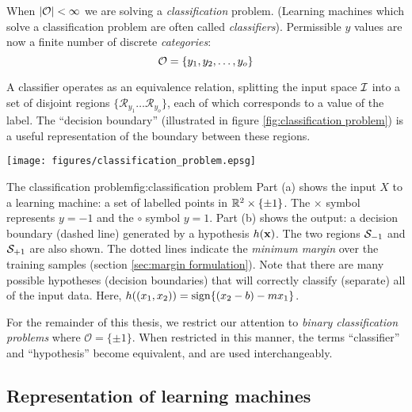 When $|\mathcal{O}| < \infty$ we are solving a \emph{classification}
problem.  (Learning machines which solve a classification problem are
often called \emph{classifiers}).  Permissible $y$ values are now
a finite number of discrete \emph{categories}:
%
\begin{equation}
\mathcal{O} = \{y_1, y_2, \ldots, y_o\}
\end{equation}

A classifier operates as an equivalence relation, splitting the input
space $\mathcal{I}$ into a set of disjoint regions $\{ \mathcal{R}_{y_1}
\ldots \mathcal{R}_{y_o} \}$, each of which corresponds to a value of
the label.  The ``decision boundary'' (illustrated in figure
\ref{fig:classification problem}) is a useful representation of the
boundary between these regions.

\begin{linefigure}
\begin{center}
\texttt{[image: figures/classification\_problem.epsg]}
\end{center}
\begin{capt}{The classification problem}{fig:classification problem}
Part (a) shows the input $X$ to a learning machine: a set of
labelled points in $\mathbb{R}^2 \times \{ \pm 1 \}$.  The $\times$ symbol
represents $y=-1$ and the $\circ$ symbol $y=1$.  Part (b) shows the
output: a decision boundary (dashed line) generated by a hypothesis
$h(\mathbf{x})$.  The two regions $\mathcal{S}_{-1}$ and $\mathcal{S}_{+1}$ are also
shown.  The dotted lines indicate the \emph{minimum margin} over the
training samples (section \ref{sec:margin formulation}).  Note that
there are many possible hypotheses (decision boundaries) that will
correctly classify (separate) all of the input data.  Here, $h((x_1,
x_2)) = \mathrm{sign}\{ (x_2 - b) - m x_1 \}$.
\end{capt}
\end{linefigure}

For the remainder of this thesis, we restrict our attention to
\emph{binary classification problems} where $\mathcal{O} = \{\pm
1\}$.  When restricted in this manner, the terms ``classifier'' and
``hypothesis'' become equivalent, and are used interchangeably.


\subsection{Representation of learning machines}
\label{sec:representation of learning machines}

